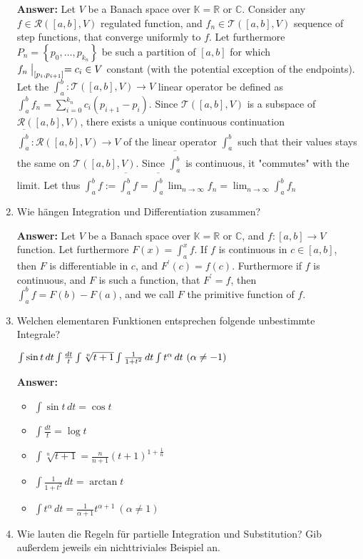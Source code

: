 \documentclass[11pt]{article}
\newcommand{\RR}[0]{\mathbb{R}}
\newcommand{\CC}[0]{\mathbb{C}}
\newcommand{\KK}[0]{\mathbb{K}}
\begin{document}
\begin{enumerate}
    \textbf{Answer:} Let $V$ be a Banach space over $\KK = \RR$ or $\CC$. Consider any $f \in \mathcal{R}([a, b], V)$ regulated function, and $f_n \in \mathcal{T}([a, b], V)$ sequence of step functions, that converge uniformly to $f$. Let furthermore $P_n = \left\{p_0, \dots, p_{k_n}\right\}$ be such a partition of $[a,b]$ for which $f_n\bigm|_{[p_i, p_{i+1}]} = c_i \in V$ constant (with the potential exception of the endpoints). Let the $\int_a^b: \mathcal{T}([a, b], V) \to V$ linear operator be defined as $\int_a^b f_n = \sum_{i=0}^{k_n} c_i (p_{i+1} - p_i)$. Since $\mathcal{T}([a, b], V)$ is a subspace of $\mathcal{R}([a, b], V)$, there exists a unique continuous continuation $\overline{\int_a^b}\colon \mathcal{R}([a, b], V) \to V$ of the linear operator $\int_a^b$ such that their values stays the same on $\mathcal{T}([a, b], V)$. Since $\overline{\int_a^b}$ is continuous, it "commutes" with the limit. Let thus $\int_a^b f:=\overline{\int_a^b}f = \overline{\int_a^b} \lim_{n\to \infty} f_n = \lim_{n\to\infty} \int_a^b f_n$

    \item Wie hängen Integration und Differentiation zusammen?

    \textbf{Answer:} Let $V$ be a Banach space over $\KK = \RR$ or $\CC$, and $f\colon [a, b] \to V$ function. Let furthermore $F(x) = \int_a^x f$. If $f$ is continuous in $c \in [a, b]$, then $F$ is differentiable in $c$, and $F^\prime(c) = f(c)$. Furthermore if $f$ is continuous, and $F$ is such a function, that $F^\prime = f$, then $\int_a^b f = F(b) - F(a)$, and we call $F$ the primitive function of $f$.

    \item Welchen elementaren Funktionen entsprechen folgende unbestimmte Integrale?

    \hspace*{\fill}
    $\int{\sin{t}\,dt} \hfill \int{\frac{dt}{t}} \hfill \int{\sqrt[n]{t+1}} \hfill \int{\frac{1}{1+t^2}\,dt} \hfill \int{t^\alpha \,dt}~(\alpha \neq -1)$
    \hspace*{\fill}


    \textbf{Answer:}
    \begin{itemize}
        \item $\int{\sin{t}\,dt} = \cos{t}$
        \item $\int{\frac{dt}{t}} = \log{t}$
        \item $\int{\sqrt[n]{t+1}} = \frac{n}{n+1} (t+1)^{1 + \frac{1}{n}}$
        \item $\int{\frac{1}{1+t^2}\,dt} = \arctan{t}$
        \item $\int{t^\alpha \,dt} = \frac{1}{\alpha + 1} t^{\alpha + 1}~(\alpha \neq 1)$
    \end{itemize}
    \item Wie lauten die Regeln für partielle Integration und Substitution? Gib außerdem jeweils ein nichttriviales Beispiel an.


\end{enumerate}
\end{document}
